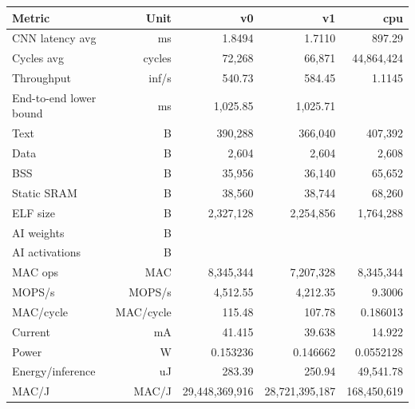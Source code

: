 \begin{tabular}{lrrrr}
\toprule
Metric & Unit & v0 & v1 & cpu \\
\midrule
CNN latency avg & ms & 1.8494 & 1.7110 & 897.29 \\
Cycles avg & cycles & 72,268 & 66,871 & 44,864,424 \\
Throughput & inf/s & 540.73 & 584.45 & 1.1145 \\
End-to-end lower bound & ms & 1,025.85 & 1,025.71 &  \\
Text & B & 390,288 & 366,040 & 407,392 \\
Data & B & 2,604 & 2,604 & 2,608 \\
BSS & B & 35,956 & 36,140 & 65,652 \\
Static SRAM & B & 38,560 & 38,744 & 68,260 \\
ELF size & B & 2,327,128 & 2,254,856 & 1,764,288 \\
AI weights & B &  &  &  \\
AI activations & B &  &  &  \\
MAC ops & MAC & 8,345,344 & 7,207,328 & 8,345,344 \\
MOPS/s & MOPS/s & 4,512.55 & 4,212.35 & 9.3006 \\
MAC/cycle & MAC/cycle & 115.48 & 107.78 & 0.186013 \\
Current & mA & 41.415 & 39.638 & 14.922 \\
Power & W & 0.153236 & 0.146662 & 0.0552128 \\
Energy/inference & uJ & 283.39 & 250.94 & 49,541.78 \\
MAC/J & MAC/J & 29,448,369,916 & 28,721,395,187 & 168,450,619 \\
\bottomrule
\end{tabular}
